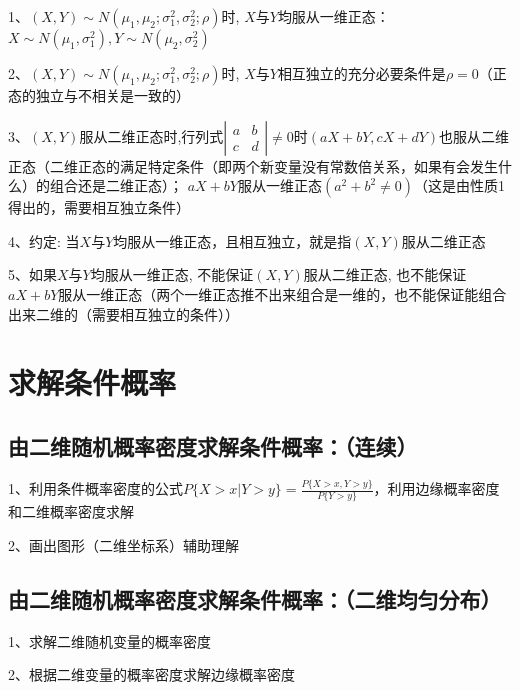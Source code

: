 1、$ \left(X, Y\right) \sim N\left(\mu_{1}, \mu_{2} ; \sigma_{1}^{2}, \sigma_{2}^{2} ; \rho\right) $时, $ X $与$ Y $均服从一维正态：$ X \sim{N}\left(\mu_{1}, \sigma_{1}^{2}\right), Y \sim N\left(\mu_{2}, \sigma_{2}^{2}\right) $

2、$ (X, Y) \sim N\left(\mu_{1}, \mu_{2} ; \sigma_{1}^{2}, \sigma_{2}^{2} ; \rho\right) $时, $ X $与$ Y $相互独立的充分必要条件是$ \rho=0 $（正态的独立与不相关是一致的）

3、$ (X, Y) $服从二维正态时,行列式$ \left|\begin{array}{ll}a & b \\ c & d\end{array}\right| \neq 0 $时$ (a X+b Y, c X+d Y) $也服从二维正态（二维正态的满足特定条件（即两个新变量没有常数倍关系，如果有会发生什么）的组合还是二维正态）； $  a X+b Y $服从一维正态$ \left(a^{2}+b^{2} \neq 0\right) $（这是由性质1得出的，需要相互独立条件）

4、约定: 当$ X $与$ Y $均服从一维正态，且相互独立，就是指$ (X, Y) $服从二维正态

5、如果$ X $与$ Y $均服从一维正态, 不能保证$ (X, Y) $服从二维正态, 也不能保证$ a X+b Y $服从一维正态（两个一维正态推不出来组合是一维的，也不能保证能组合出来二维的（需要相互独立的条件））

\section{求解条件概率}



\subsection{由二维随机概率密度求解条件概率：（连续）}

1、利用条件概率密度的公式$ P\{X>x|Y>y\} = \frac {P\{X>x,Y>y\}}{P\{Y>y\}} $，利用边缘概率密度和二维概率密度求解

2、画出图形（二维坐标系）辅助理解



\subsection{由二维随机概率密度求解条件概率：（二维均匀分布）}

1、求解二维随机变量的概率密度

2、根据二维变量的概率密度求解边缘概率密度

